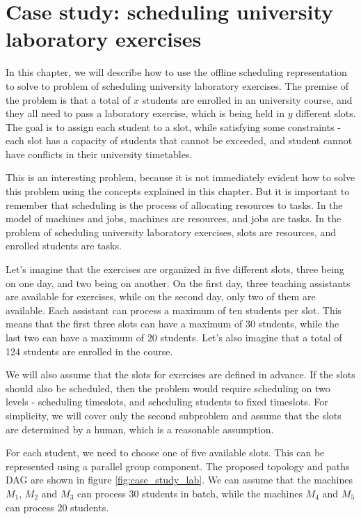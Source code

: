 \section{Case study: scheduling university laboratory exercises}
\label{sec:case_study_lab}

In this chapter, we will describe how to use the offline scheduling representation to solve to problem of scheduling university laboratory exercises. The premise of the problem is that a total of $x$ students are enrolled in an university course, and they all need to pass a laboratory exercise, which is being held in $y$ different slots. The goal is to assign each student to a slot, while satisfying some constraints - each slot has a capacity of students that cannot be exceeded, and student cannot have conflicts in their university timetables.

This is an interesting problem, because it is not immediately evident how to solve this problem using the concepts explained in this chapter. But it is important to remember that scheduling is the process of allocating resources to tasks. In the model of machines and jobs, machines are resources, and jobs are tasks. In the problem of scheduling university laboratory exercises, slots are resources, and enrolled students are tasks.

Let's imagine that the exercises are organized in five different slots, three being on one day, and two being on another. On the first day, three teaching assistants are available for exercises, while on the second day, only two of them are available. Each assistant can process a maximum of ten students per slot. This means that the first three slots can have a maximum of $30$ students, while the last two can have a maximum of $20$ students. Let's also imagine that a total of 124 students are enrolled in the course.

We will also assume that the slots for exercises are defined in advance. If the slots should also be scheduled, then the problem would require scheduling on two levels - scheduling timeslots, and scheduling students to fixed timeslots. For simplicity, we will cover only the second subproblem and assume that the slots are determined by a human, which is a reasonable assumption.

For each student, we need to choose one of five available slots. This can be represented using a parallel group component. The proposed topology and paths DAG are shown in figure \ref{fig:case_study_lab}. We can assume that the machines $M_1$, $M_2$ and $M_3$ can process $30$ students in batch, while the machines $M_4$ and $M_5$ can process $20$ students.


